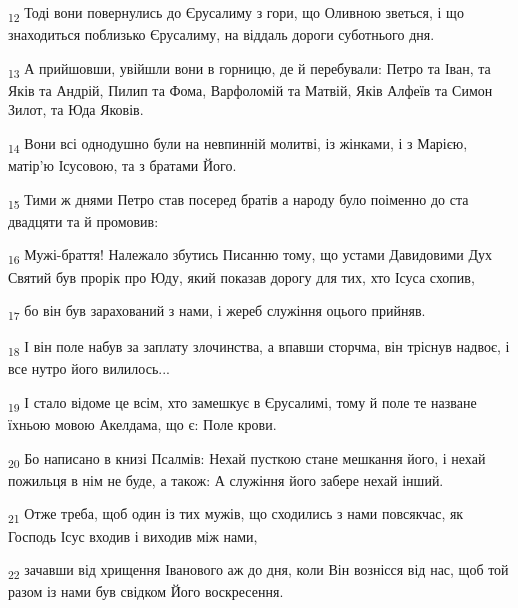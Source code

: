 \begin{tcolorbox}
\textsubscript{12} Тоді вони повернулись до Єрусалиму з гори, що Оливною зветься, і що знаходиться поблизько Єрусалиму, на віддаль дороги суботнього дня.
\end{tcolorbox}
\begin{tcolorbox}
\textsubscript{13} А прийшовши, увійшли вони в горницю, де й перебували: Петро та Іван, та Яків та Андрій, Пилип та Фома, Варфоломій та Матвій, Яків Алфеїв та Симон Зилот, та Юда Яковів.
\end{tcolorbox}
\begin{tcolorbox}
\textsubscript{14} Вони всі однодушно були на невпинній молитві, із жінками, і з Марією, матір'ю Ісусовою, та з братами Його.
\end{tcolorbox}
\begin{tcolorbox}
\textsubscript{15} Тими ж днями Петро став посеред братів а народу було поіменно до ста двадцяти та й промовив:
\end{tcolorbox}
\begin{tcolorbox}
\textsubscript{16} Мужі-браття! Належало збутись Писанню тому, що устами Давидовими Дух Святий був прорік про Юду, який показав дорогу для тих, хто Ісуса схопив,
\end{tcolorbox}
\begin{tcolorbox}
\textsubscript{17} бо він був зарахований з нами, і жереб служіння оцього прийняв.
\end{tcolorbox}
\begin{tcolorbox}
\textsubscript{18} І він поле набув за заплату злочинства, а впавши сторчма, він тріснув надвоє, і все нутро його вилилось...
\end{tcolorbox}
\begin{tcolorbox}
\textsubscript{19} І стало відоме це всім, хто замешкує в Єрусалимі, тому й поле те назване їхньою мовою Акелдама, що є: Поле крови.
\end{tcolorbox}
\begin{tcolorbox}
\textsubscript{20} Бо написано в книзі Псалмів: Нехай пусткою стане мешкання його, і нехай пожильця в нім не буде, а також: А служіння його забере нехай інший.
\end{tcolorbox}
\begin{tcolorbox}
\textsubscript{21} Отже треба, щоб один із тих мужів, що сходились з нами повсякчас, як Господь Ісус входив і виходив між нами,
\end{tcolorbox}
\begin{tcolorbox}
\textsubscript{22} зачавши від хрищення Іванового аж до дня, коли Він вознісся від нас, щоб той разом із нами був свідком Його воскресення.
\end{tcolorbox}
